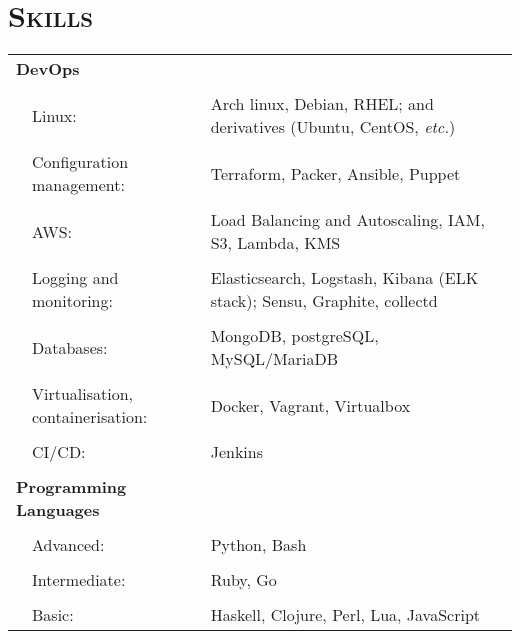 \documentclass[a4paper,10pt]{article} %
\begin{document}
\section{\textsc{Skills}}
\begin{tabularx}{\textwidth}{p{0.3cm}|p{4cm}X}
\multicolumn{2}{l}{\textbf{DevOps}} & \\
\multicolumn{3}{c}{} \\ %
   & Linux:                              & Arch linux, Debian, RHEL; and derivatives (Ubuntu, CentOS,
                                           \emph{etc.}) \\
     \\
   & Configuration management:           & Terraform, Packer, Ansible, Puppet \\
     \\
   & AWS:                                & Load Balancing and Autoscaling, IAM, S3, Lambda, KMS \\
     \\
   & Logging and monitoring:             & Elasticsearch, Logstash, Kibana (ELK stack); Sensu, Graphite,
                                           collectd \\
     \\
   & Databases:                          & MongoDB, postgreSQL, MySQL/MariaDB \\
     \\
   & Virtualisation, containerisation:   & Docker, Vagrant, Virtualbox \\
     \\
   & CI/CD:                              & Jenkins \\
\multicolumn{3}{c}{} \\ %
\multicolumn{2}{l}{\textbf{Programming Languages}}      & \\
\multicolumn{3}{c}{} \\ %
  &  Advanced:                           & Python, Bash \\
     \\
  &  Intermediate:                       & Ruby, Go \\
     \\
  &  Basic:                              & Haskell, Clojure, Perl, Lua, JavaScript \\
\end{tabularx}
\end{document}
